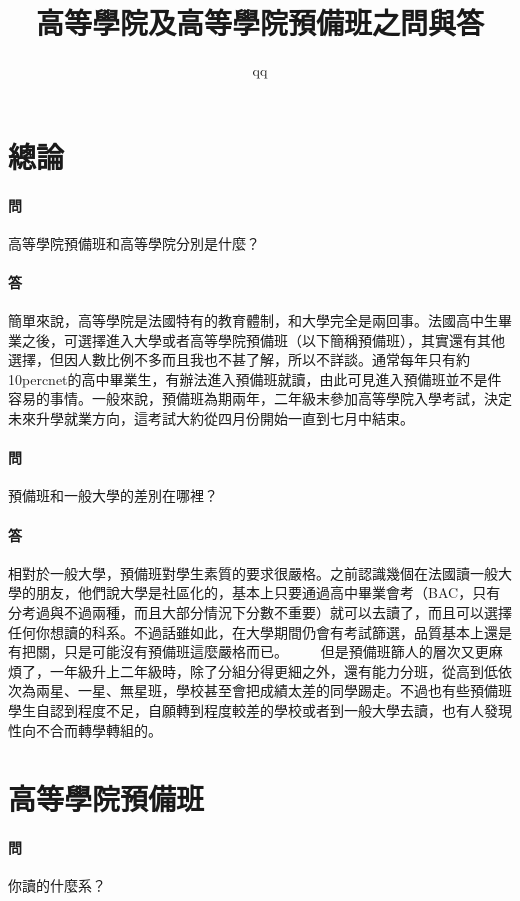 \documentclass[a4paper]{article}
\title{高等學院及高等學院預備班之問與答}
\author{qq}
\date{}
\begin{document}
\maketitle
\tableofcontents

\section{總論}

\paragraph{問}
高等學院預備班和高等學院分別是什麼？
\paragraph{答}
簡單來說，高等學院是法國特有的教育體制，和大學完全是兩回事。法國高中生畢業之後，可選擇進入大學或者高等學院預備班（以下簡稱預備班），其實還有其他選擇，但因人數比例不多而且我也不甚了解，所以不詳談。通常每年只有約10percnet的高中畢業生，有辦法進入預備班就讀，由此可見進入預備班並不是件容易的事情。一般來說，預備班為期兩年，二年級末參加高等學院入學考試，決定未來升學就業方向，這考試大約從四月份開始一直到七月中結束。
\paragraph{問}
預備班和一般大學的差別在哪裡？
\paragraph{答}
相對於一般大學，預備班對學生素質的要求很嚴格。之前認識幾個在法國讀一般大學的朋友，他們說大學是社區化的，基本上只要通過高中畢業會考（BAC，只有分考過與不過兩種，而且大部分情況下分數不重要）就可以去讀了，而且可以選擇任何你想讀的科系。不過話雖如此，在大學期間仍會有考試篩選，品質基本上還是有把關，只是可能沒有預備班這麼嚴格而已。
　　但是預備班篩人的層次又更麻煩了，一年級升上二年級時，除了分組分得更細之外，還有能力分班，從高到低依次為兩星、一星、無星班，學校甚至會把成績太差的同學踢走。不過也有些預備班學生自認到程度不足，自願轉到程度較差的學校或者到一般大學去讀，也有人發現性向不合而轉學轉組的。


\section{高等學院預備班}
\paragraph{問}
你讀的什麼系？
\end{document}
